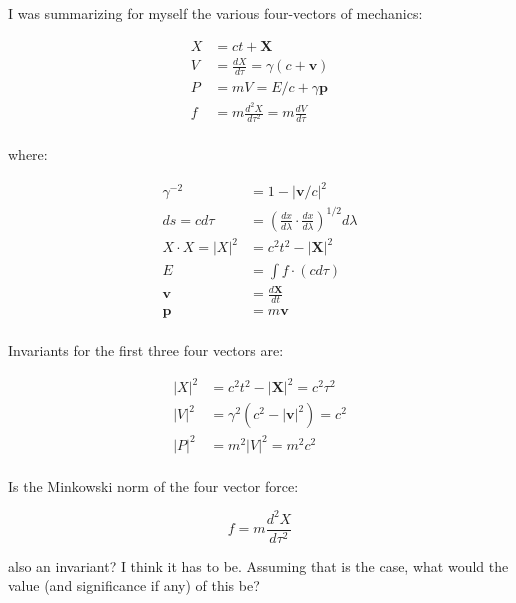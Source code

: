 I was summarizing for myself the various four-vectors of mechanics:

\begin{align*}
X &= ct + \mathbf{X} \\
V &= \frac{d X}{d\tau} = \gamma(c + \mathbf{v}) \\
P &= m V = E/c + \gamma\mathbf{p} \\
f &= m\frac{d^2 X}{d\tau^2} = m\frac{d V}{d\tau} \\
\end{align*}

where:

\begin{align*}
\gamma^{-2} &= 1 - {\lvert \mathbf{v}/c \rvert}^2 \\
ds = c d\tau &= {\left(\frac{dx}{d\lambda} \cdot \frac{dx}{d\lambda}\right)}^{1/2} d\lambda \\
X \cdot X = {\lvert X \rvert}^2 &= c^2t^2 - {\lvert \mathbf{X} \rvert}^2 \\
E &= \int f \cdot (c d\tau) \\
\mathbf{v} &= \frac{d\mathbf{X}}{dt} \\
\mathbf{p} &= m\mathbf{v} \\
\end{align*}

Invariants for the first three four vectors are:

\begin{align*}
{\lvert X \rvert}^2 &= c^2 t^2 - {\lvert \mathbf{X} \rvert}^2 = c^2 \tau^2 \\
{\lvert V \rvert}^2 &= \gamma^2 (c^2 - {\lvert \mathbf{v} \rvert}^2) = c^2 \\
{\lvert P \rvert}^2 &= m^2 {\lvert V \rvert}^2 = m^2 c^2 \\
\end{align*}

Is the Minkowski norm of the four vector force:

\[
f = m\frac{d^2 X}{d\tau^2} 
\]

also an invariant?  I think it has to be.  Assuming that is the case, what would the value (and significance if any) of this be?

